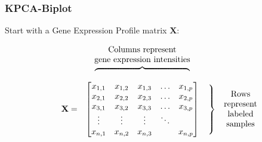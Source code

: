 \documentclass[serif]{beamer}
\begin{document}
	\begin{frame}
		\frametitle{}
	\end{frame}
	


	\begin{frame}
		\frametitle{KPCA-Biplot}
			Start with a Gene Expression Profile matrix $\mathbf{X}$:

			\begin{equation}			
			\begin{matrix}
			& & \text{Columns represent} & & \\
			& & \text{gene expression intensities} & & \\
			& & \rotatebox[origin=c]{270}{$\begin{cases} & \\  & \\ & \\ & \\ &  \\ & \\ &  \\  & \\ \end{cases}$} & & \\
			&\mathbf{X}=  
			&       \begin{bmatrix}
					x_{1,1} & x_{1,2} & x_{1,3} & \ldots  & x_{1,p} \\ 
					x_{2,1} & x_{2,2} & x_{2,3} & \ldots  & x_{2,p} \\ 
					x_{3,1} & x_{3,2} & x_{3,3} & \ldots  & x_{3,p} \\ 
					\vdots   & \vdots   & \vdots   & \ddots  &              \\ 
					x_{n,1} & x_{n,2} & x_{n,3} &            & x_{n,p} \\ 
				\end{bmatrix}
			&\left.\begin{matrix}\\ \\ \\ \\ \\  \end{matrix}\right\}
                                & \rotatebox[origin=c]{0}{$ \begin{matrix} 
						                    \text{Rows}        \\
							          \text{represent} \\ 
							          \text{labeled}     \\
							          \text{samples}    \\ 
                                                                               \end{matrix}$} \\


\end{matrix}
\end{equation}
\end{frame}
\end{document}
